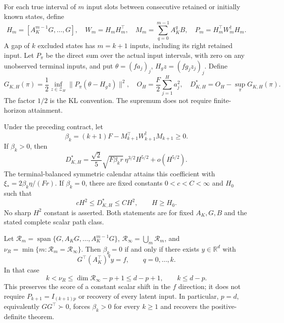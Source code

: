 For each true interval of $m$ input slots between consecutive
retained or initially known states, define
\begin{equation}\label{m2sreg:interval}
H_m=[A_K^{m-1}G,\ldots,G],\quad W_m=H_mH_m^\top,\quad
M_m=\sum_{q=0}^{m-1}A_K^qB,\quad P_m=H_m^\top W_m^\dagger H_m .
\end{equation}
A gap of $k$ excluded states has $m=k+1$ inputs, including its right
retained input. Let $P_\pi$ be the direct sum over the actual input
intervals, with zero on any unobserved terminal inputs, and put
$\theta=(fa_j)_j$, $H_gz=(fg_jz_j)_j$.
Define
\begin{equation}\label{m2sreg:information}
G_{K,H}(\pi)=\frac12\inf_{z\in\mathcal Z_H}
 \|P_\pi(\theta-H_gz)\|^2,\quad
O_H=\frac F2\sum_{j=1}^Ha_j^2,\quad
D_{K,H}^*=O_H-\sup_\pi G_{K,H}(\pi).
\end{equation}
The factor $1/2$ is the KL convention. The supremum does not require
finite-horizon attainment.

\begin{theorem}\label{m2sreg:theorem}
Under the preceding contract, let
\[
\beta_k=(k+1)F-M_{k+1}^\top W_{k+1}^\dagger M_{k+1}\ge0.
\]
If $\beta_k>0$, then
\begin{equation}\label{m2sreg:positive}
D_{K,H}^*=\frac{\sqrt2}{5}\sqrt{F\beta_k r}\,
 \eta^{3/2}H^{5/2}+o(H^{5/2}).
\end{equation}
The terminal-balanced symmetric calendar attains this coefficient with
$\xi_*=2\beta_k\eta/(Fr)$.
If $\beta_k=0$, there are fixed constants $0<c<C<\infty$ and $H_0$
such that
\begin{equation}\label{m2sreg:zero}
cH^2\le D_{K,H}^*\le CH^2,\qquad H\ge H_0 .
\end{equation}
No sharp $H^2$ constant is asserted. Both statements are for fixed
$A_K,G,B$ and the stated complete scalar path class.
\end{theorem}

\begin{proposition}
\label{m2sreg:capacity}
Let $\mathcal R_m=\operatorname{span}\{G,A_KG,\ldots,A_K^{m-1}G\}$,
$\mathcal R_\infty=\bigcup_m\mathcal R_m$, and
$\nu_R=\min\{m:\mathcal R_m=\mathcal R_\infty\}$.
Then $\beta_k=0$ if and only if there exists $y\in\mathbb R^d$ with
\begin{equation}\label{m2sreg:score}
G^\top(A_K^\top)^q y=f,\qquad q=0,\ldots,k.
\end{equation}
In that case
\begin{equation}\label{m2sreg:dimension}
k<\nu_R\le\dim\mathcal R_\infty-p+1\le d-p+1,
\qquad k\le d-p.
\end{equation}
This preserves the score of a constant scalar shift in the $f$ direction;
it does not require $P_{k+1}=I_{(k+1)p}$ or recovery of every latent input.
In particular, $p=d$, equivalently $GG^\top\succ0$, forces
$\beta_k>0$ for every $k\ge1$ and recovers the positive-definite theorem.
\end{proposition}

